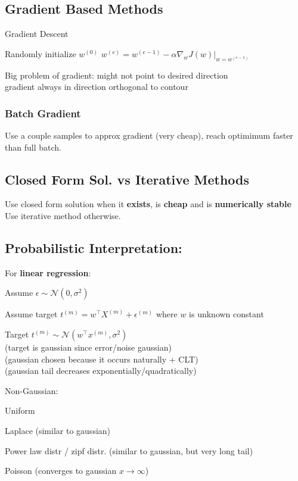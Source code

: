\documentclass{article}
\begin{document}
\subsection{Gradient Based Methods}
\begin{algorithm}
  \caption{Gradient Descent}
  Randomly initialize $w^{(0)}$\;
  {
    $w^{(e)} = w^{(e-1)} - \alpha \nabla _w J(w) \bigg | _{w=w^{(e-1)}  }$
  }
\end{algorithm}
\noindent
Big problem of gradient: might not point to desired direction 
\\
gradient always in direction orthogonal to contour 
\subsubsection{Batch Gradient}
Use a couple samples to approx gradient (very cheap), reach optimimum faster than full batch.

\subsection{Closed Form Sol. vs Iterative Methods}
Use closed form solution when it \textbf{exists}, is \textbf{cheap} and is \textbf{numerically stable}
\\
Use iterative method otherwise.

\subsection{Probabilistic Interpretation:}
For \textbf{linear regression}: 
\begin{list}{}{}
  \item Assume $\epsilon \sim \mathcal N (0, \sigma ^2)$
  \item Assume target $t^{(m)} = w^\top X^{(m)} + \epsilon ^{(m)}$ where $w$ is unknown constant
  \item Target $t^{(m)} \sim \mathcal N (w^\top x^{(m)}, \sigma ^2)$ \\
        (target is gaussian since error/noise gaussian) 
        \\
        (gaussian chosen because it occurs naturally + CLT) \\
        (gaussian tail decreases exponentially/quadratically)
\end{list}
\noindent
Non-Gaussian:
\begin{list}{}{}
  \item Uniform
  \item Laplace (similar to gaussian)
  \item Power law distr / zipf distr. (similar to gaussian, but very long tail)
  \item Poisson (converges to gaussian $x\to \infty$)
\end{list}
\end{document}

